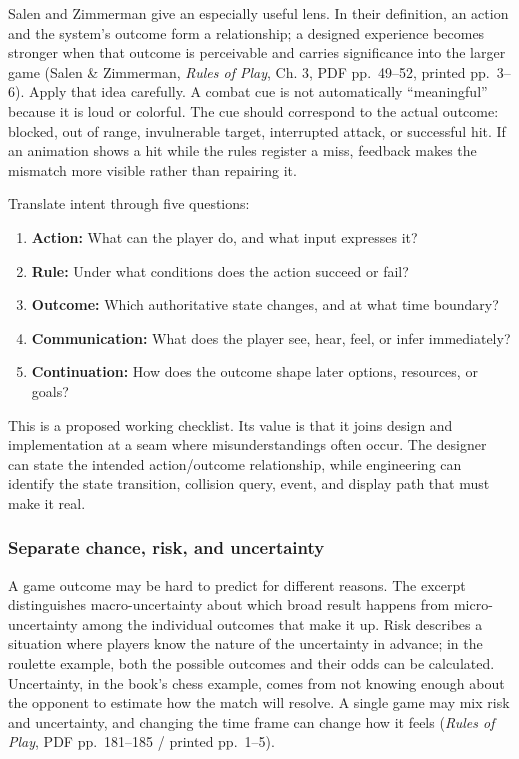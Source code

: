 Salen and Zimmerman give an especially useful lens. In their definition, an action and the system's outcome form a relationship; a designed experience becomes stronger when that outcome is perceivable and carries significance into the larger game (Salen \& Zimmerman, \emph{Rules of Play}, Ch. 3, PDF pp.~49--52, printed pp.~3--6). Apply that idea carefully. A combat cue is not automatically ``meaningful'' because it is loud or colorful. The cue should correspond to the actual outcome: blocked, out of range, invulnerable target, interrupted attack, or successful hit. If an animation shows a hit while the rules register a miss, feedback makes the mismatch more visible rather than repairing it.

Translate intent through five questions:

\begin{enumerate}
\def\labelenumi{\arabic{enumi}.}
\tightlist
\item
  \textbf{Action:} What can the player do, and what input expresses it?
\item
  \textbf{Rule:} Under what conditions does the action succeed or fail?
\item
  \textbf{Outcome:} Which authoritative state changes, and at what time boundary?
\item
  \textbf{Communication:} What does the player see, hear, feel, or infer immediately?
\item
  \textbf{Continuation:} How does the outcome shape later options, resources, or goals?
\end{enumerate}

This is a proposed working checklist. Its value is that it joins design and implementation at a seam where misunderstandings often occur. The designer can state the intended action/outcome relationship, while engineering can identify the state transition, collision query, event, and display path that must make it real.

\subsubsection{Separate chance, risk, and uncertainty}\label{05-engine-i-ch009-separate-chance-risk-and-uncertainty}

\hypertarget{05-engine-i-ch009-separate-chance-risk-and-uncertainty}{}

A game outcome may be hard to predict for different reasons. The excerpt distinguishes macro-uncertainty about which broad result happens from micro-uncertainty among the individual outcomes that make it up. Risk describes a situation where players know the nature of the uncertainty in advance; in the roulette example, both the possible outcomes and their odds can be calculated. Uncertainty, in the book's chess example, comes from not knowing enough about the opponent to estimate how the match will resolve. A single game may mix risk and uncertainty, and changing the time frame can change how it feels (\emph{Rules of Play}, PDF pp.~181--185 / printed pp.~1--5).


